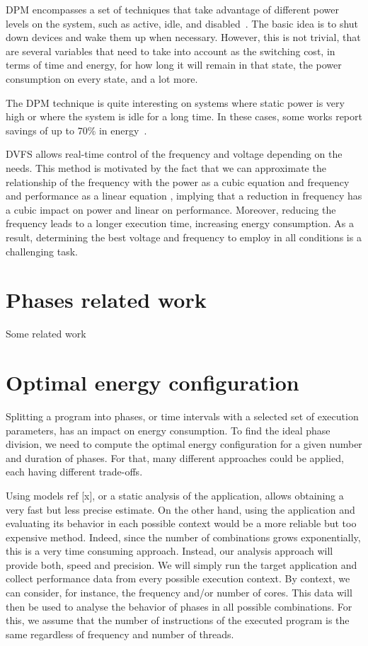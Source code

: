 DPM encompasses a set of techniques that take advantage of different power levels on the system, such as active, idle, and disabled~\cite{CARDOSO201717, Shuja2012Energy-efficientCenters, Benini2000AManagement}. The basic idea is to shut down devices and wake them up when necessary. However, this is not trivial, that are several variables that need to take into account as the switching cost, in terms of time and energy, for how long it will remain in that state,  the power consumption on every state, and a lot more. 

The DPM technique is quite interesting on systems where static power is very high or where the system is idle for a long time. In these cases, some works report savings of up to 70\% in energy~\cite{Shuja2012Energy-efficientCenters, Benini2000AManagement}.

DVFS allows real-time control of the frequency and voltage depending on the needs. This method is motivated by the fact that we can approximate the relationship of the frequency with the power as a cubic equation and frequency and performance as a linear equation \cite{Dayarathna2016DataSurvey, Group2012HandbookSahni}, implying that a reduction in frequency has a cubic impact on power and linear on performance. Moreover, reducing the frequency leads to a longer execution time, increasing energy consumption. As a result, determining the best voltage and frequency to employ in all conditions is a challenging task.

\section{Phases related work} \label{sec:related_work_phases}
Some related work

\section{Optimal energy configuration} \label{sec:Optimal_energy_configuration}
Splitting a program into phases, or time intervals with a selected set of execution parameters, has an impact on energy consumption. To find the ideal phase division, we need to compute the optimal energy configuration for a given number and duration of phases. For that, many different approaches could be applied, each having different trade-offs. 

Using models ref [x], or a static analysis of the application, allows obtaining a very fast but less precise estimate. On the other hand, using the application and evaluating its behavior in each possible context would be a more reliable but too expensive method. Indeed, since the number of combinations grows exponentially, this is a very time consuming approach. Instead, our analysis approach will provide both, speed and precision. We will simply run the target application and collect performance data from every possible execution context. By context, we can consider, for instance, the frequency and/or number of cores. This data will then be used to analyse the behavior of phases in all possible combinations. For this, we assume that the number of instructions of the executed program is the same regardless of frequency and number of threads.

